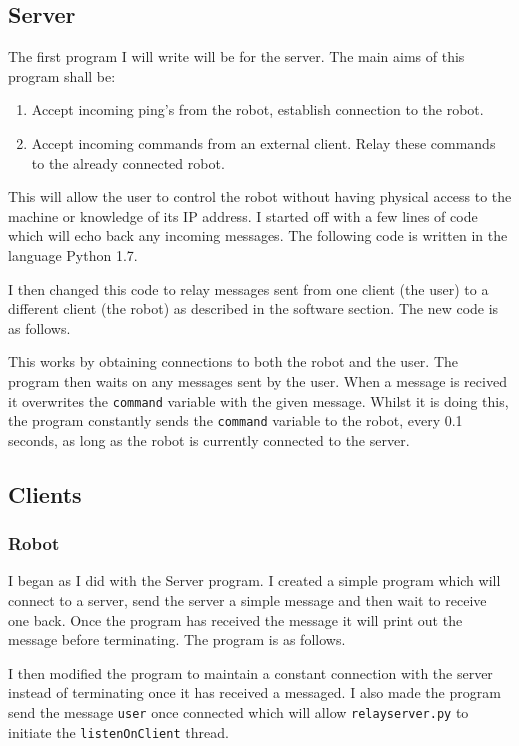 \documentclass[]{report}   %
\begin{document}
				\subsection{Server}
					The first program I will write will be for the server. The main aims of this program shall be:
					\begin{enumerate}
						\item Accept incoming ping's from the robot, establish connection to the robot.
						\item Accept incoming commands from an external client. Relay these commands to the already connected robot.
					\end{enumerate}
					This will allow the user to control the robot without having physical access to the machine or knowledge of its IP address. I started off with a
					few lines of code which will echo back any incoming messages. The following code is written in the language Python 1.7.
					
					I then changed this code to relay messages sent from one client (the user) to a different client (the robot) as described in the software section.
					The new code is as follows.
					
					This works by obtaining connections to both the robot and the user. The program then waits on any messages sent by the user. When a message is recived it
					overwrites the \lstinline{command} variable with the given message. Whilst it is doing this, the program constantly sends the \lstinline{command} variable to the robot,
					every 0.1 seconds, as long as the robot is currently connected to the server.
				
				\subsection{Clients}
					\subsubsection{Robot}
						I began as I did with the Server program. I created a simple program which will connect to a server, send the server a simple message and then wait to
						receive one back. Once the program has received the message it will print out the message before terminating. The program is as follows.
						
						
						I then modified the program to maintain a constant connection with the server instead of terminating once it has received a messaged. I also made the
						program send the message \lstinline{user} once connected which will allow \lstinline{relayserver.py} to initiate the \lstinline{listenOnClient} thread.
							
						
\end{document}
